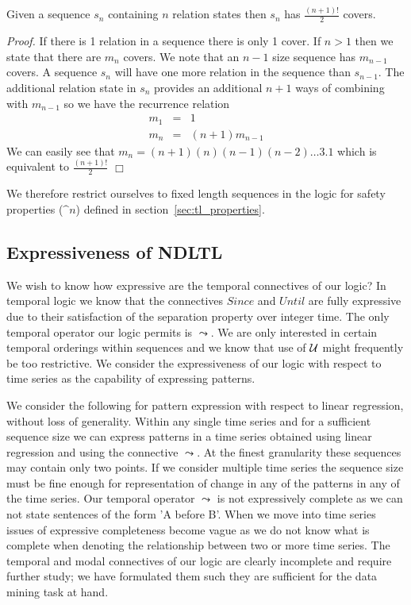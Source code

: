 \begin{lemma}\label{lemma:covernum}
\begin{rm}
Given a sequence $s_n$ containing $n$ relation states then $s_n$ has
$\frac{(n+1)!}{2}$ covers.
\end{rm}
\end{lemma}

{\em Proof.} If there is 1 relation in a sequence there is only 1
cover.  If $n > 1$
then we state that there are $m_n$ covers.  We note that an $n-1$ size
sequence has $m_{n-1}$ covers. A sequence $s_n$ will have one more
relation in the sequence than $s_{n-1}$. The additional relation state in
$s_n$ provides an additional $n+1$ ways of combining with $m_{n-1}$ so
we have the recurrence relation
\begin{eqnarray*}
	m_1	& = & 1 \\
	m_n	& = & (n+1)m_{n-1}
\end{eqnarray*}
We can easily see that $m_n = (n+1)(n)(n-1)(n-2) \ldots 3.1$
which is equivalent to $\frac{(n+1)!}{2}$  $\Box$

\medskip

We therefore restrict ourselves to fixed length sequences in the logic
for safety properties ($\bm^n$) defined in section~\ref{sec:tl_properties}.

\subsection{Expressiveness of NDLTL}

We wish to know how expressive are the temporal connectives of our
logic? In temporal logic we know that the connectives $Since$ and
$Until$ are fully expressive \cite{gps80} due to their satisfaction of
the separation property over integer time. The only temporal operator
our logic permits is $\leadsto$. We are only interested in certain
temporal orderings within sequences and we know that use of ${\cal U}$
might frequently be too restrictive. We consider the expressiveness of
our logic with respect to time series as the capability of expressing
patterns. 

\medskip
We consider the following for pattern expression with respect to
linear regression, without loss of generality. Within any single time
series and for a sufficient sequence size we can express patterns in a
time series obtained using linear regression and using the connective
$\leadsto$. At the finest
granularity these sequences may contain only two points. If we
consider multiple 
time series the sequence size must be fine enough for representation
of change in any of the patterns in any of the time series. Our
temporal operator $\leadsto$ is not expressively complete as we can
not state sentences of the form 'A before B'. When we move into time
series issues of expressive completeness become vague as we do not
know what is complete when denoting the relationship between two or
more time series. The
temporal and modal connectives of our logic are clearly incomplete and
require further study; we have
formulated them such they are sufficient for the data mining task at hand.


